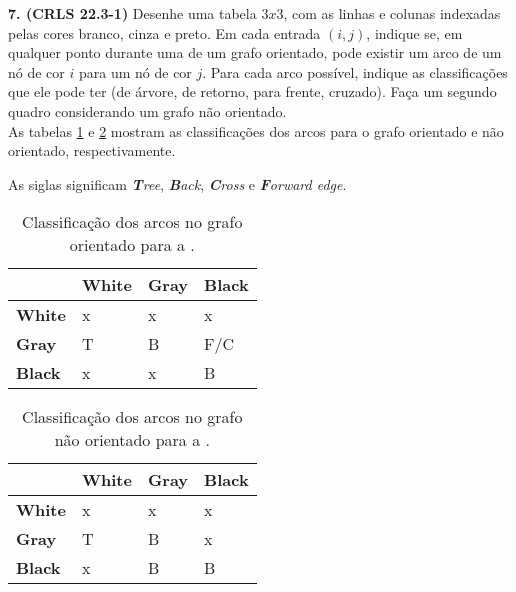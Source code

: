

\noindent\textbf{7. (CRLS 22.3-1)} Desenhe uma tabela $3 x 3$, com as linhas e colunas indexadas pelas cores branco, cinza e preto. Em cada entrada $(i, j)$, indique se, em qualquer ponto durante uma  de um grafo orientado, pode existir um arco de um nó de cor $i$ para um nó de cor $j$. Para cada arco possível, indique as classificações que ele pode ter (de árvore, de retorno, para frente, cruzado). Faça um segundo quadro considerando um grafo não orientado.\\[6pt]
As tabelas \ref{tbl:7-7-1} e \ref{tbl:7-7-2} mostram as classificações dos arcos para o grafo orientado e não orientado, respectivamente.

As siglas significam \textit{\textbf{T}ree}, \textit{\textbf{B}ack}, \textit{\textbf{C}ross} e \textit{\textbf{F}orward edge}.

\begin{table}[H]
\centering
\begin{tabular}{l | lll}
\textbf{}      & \textbf{White} & \textbf{Gray} & \textbf{Black} \\
\hline
\textbf{White} & x              & x             & x              \\
\textbf{Gray}  & T              & B             & F/C            \\
\textbf{Black} & x              & x             & B           
\end{tabular}
\caption{Classificação dos arcos no grafo orientado para a .}
\label{tbl:7-7-1}
\end{table}

\begin{table}[H]
\centering
\begin{tabular}{l | lll}
\textbf{}      & \textbf{White} & \textbf{Gray} & \textbf{Black} \\
\hline
\textbf{White} & x              & x             & x              \\
\textbf{Gray}  & T              & B             & x              \\
\textbf{Black} & x              & B             & B               
\end{tabular}
\caption{Classificação dos arcos no grafo não orientado para a .}
\label{tbl:7-7-2}
\end{table}